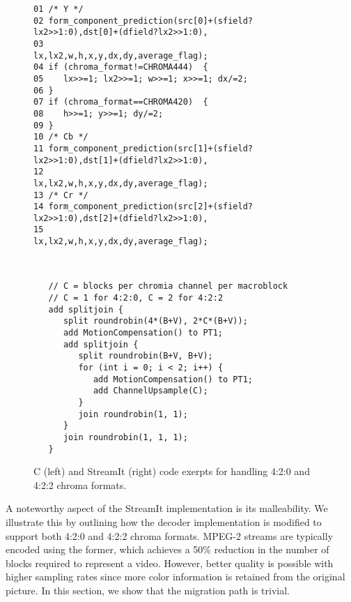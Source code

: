 \label{section:chroma}

\begin{figure*}[t]
 \begin{minipage}[t]{4.1in}{
  \begin{scriptsize}
   \begin{verbatim}
01 /* Y */
02 form_component_prediction(src[0]+(sfield?lx2>>1:0),dst[0]+(dfield?lx2>>1:0),
03                           lx,lx2,w,h,x,y,dx,dy,average_flag);
04 if (chroma_format!=CHROMA444)  {
05    lx>>=1; lx2>>=1; w>>=1; x>>=1; dx/=2;
06 }
07 if (chroma_format==CHROMA420)  {
08    h>>=1; y>>=1; dy/=2;
09 }
10 /* Cb */
11 form_component_prediction(src[1]+(sfield?lx2>>1:0),dst[1]+(dfield?lx2>>1:0),
12                           lx,lx2,w,h,x,y,dx,dy,average_flag);
13 /* Cr */
14 form_component_prediction(src[2]+(sfield?lx2>>1:0),dst[2]+(dfield?lx2>>1:0),
15                           lx,lx2,w,h,x,y,dx,dy,average_flag);    
   \end{verbatim}
  \end{scriptsize}
 }
 \label{fig:chroma-stream}
\vspace{-12pt}
 \end{minipage}
 ~\vrule
 \begin{minipage}[t]{4.3in}{
  \begin{scriptsize}
   \begin{verbatim}
   // C = blocks per chromia channel per macroblock 
   // C = 1 for 4:2:0, C = 2 for 4:2:2
   add splitjoin {
      split roundrobin(4*(B+V), 2*C*(B+V));
      add MotionCompensation() to PT1;
      add splitjoin {
         split roundrobin(B+V, B+V);
         for (int i = 0; i < 2; i++) {
            add MotionCompensation() to PT1;
            add ChannelUpsample(C);
         }
         join roundrobin(1, 1);
      }
      join roundrobin(1, 1, 1);
   }
   \end{verbatim}
  \end{scriptsize}
 }
 \vspace{-12pt}
 \end{minipage}
 \caption{C (left) and StreamIt (right) code exerpts for handling
          4:2:0 and 4:2:2 chroma formats.} %
 \label{fig:chroma-format-code}
\end{figure*}

A noteworthy aspect of the StreamIt implementation is its
malleability. We illustrate this by outlining how the decoder
implementation is modified to support both 4:2:0 and 4:2:2 chroma
formats. MPEG-2 streams are typically encoded using the former, which
achieves a 50\% reduction in the number of blocks required to
represent a video. However, better quality is possible with higher
sampling rates since more color information is retained from the
original picture. In this section, we show that the migration path is
trivial.

